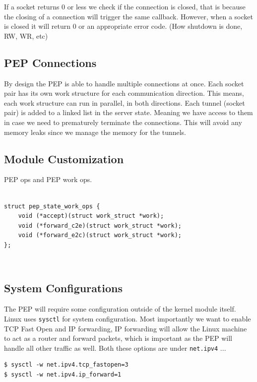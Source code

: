 \documentclass[a4paper,english, 11pt]{report}
\begin{document}
If a socket returns 0 or less we check if the connection is closed, that is because the closing of a connection will trigger the same callback. However, when a socket is closed it will return 0 or an appropriate error code. (How shutdown is done, RW, WR, etc)

\subsection{PEP Connections}
By design the PEP is able to handle multiple connections at once. Each socket pair has its own work structure for each communication direction. This means, each work structure can run in parallel, in both directions. Each tunnel (socket pair) is added to a linked list in the server state. Meaning we have access to them in case we need to prematurely terminate the connections. This will avoid any memory leaks since we manage the memory for the tunnels.\\

\subsection{Module Customization}
PEP ops and PEP work ops.\\\\
\noindent\begin{minipage}{\linewidth}
\begin{verbatim}
struct pep_state_work_ops {
    void (*accept)(struct work_struct *work);
    void (*forward_c2e)(struct work_struct *work);
    void (*forward_e2c)(struct work_struct *work);
};
\end{verbatim}
\end{minipage}\\

\subsection{System Configurations}
The PEP will require some configuration outside of the kernel module itself. Linux uses \verb|sysctl| for system configuration. Most importantly we want to enable TCP Fast Open and IP forwarding, IP forwarding will allow the Linux machine to act as a router and forward packets, which is important as the PEP will handle all other traffic as well. Both these options are under \verb|net.ipv4| ...\\

\begin{verbatim}
$ sysctl -w net.ipv4.tcp_fastopen=3
$ sysctl -w net.ipv4.ip_forward=1 
\end{verbatim}
\end{document}
